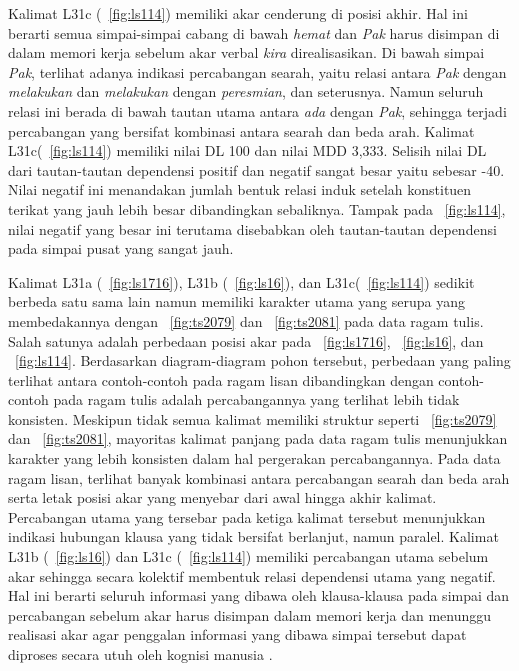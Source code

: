 Kalimat L31c (\pic~\ref{fig:ls114}) memiliki akar cenderung di posisi akhir. Hal ini berarti semua simpai-simpai cabang di bawah \textit{hemat} dan \textit{Pak} harus disimpan di dalam memori kerja sebelum akar verbal \textit{kira} direalisasikan. Di bawah simpai \textit{Pak}, terlihat adanya indikasi percabangan searah, yaitu relasi antara \textit{Pak} dengan \textit{melakukan} dan \textit{melakukan} dengan \textit{peresmian}, dan seterusnya. Namun seluruh relasi ini berada di bawah tautan utama antara \textit{ada} dengan \textit{Pak}, sehingga terjadi percabangan yang bersifat kombinasi antara searah dan beda arah. Kalimat L31c(\pic~\ref{fig:ls114}) memiliki nilai DL 100 dan nilai MDD 3,333. Selisih nilai DL dari tautan-tautan dependensi positif dan negatif sangat besar yaitu sebesar -40. Nilai negatif ini menandakan jumlah bentuk relasi induk setelah konstituen terikat yang jauh lebih besar dibandingkan sebaliknya. Tampak pada \pic~\ref{fig:ls114}, nilai negatif yang besar ini terutama disebabkan oleh tautan-tautan dependensi pada simpai pusat yang sangat jauh.

Kalimat L31a (\pic~\ref{fig:ls1716}), L31b (\pic~\ref{fig:ls16}), dan L31c(\pic~\ref{fig:ls114}) sedikit berbeda satu sama lain namun memiliki karakter utama yang serupa yang membedakannya dengan \pic~\ref{fig:ts2079} dan \pic~\ref{fig:ts2081} pada data ragam tulis. Salah satunya adalah perbedaan posisi akar pada \pic~\ref{fig:ls1716}, \pic~\ref{fig:ls16}, dan \pic~\ref{fig:ls114}. Berdasarkan diagram-diagram pohon tersebut, perbedaan yang paling terlihat antara contoh-contoh pada ragam lisan dibandingkan dengan contoh-contoh pada ragam tulis adalah percabangannya yang terlihat lebih tidak konsisten. Meskipun tidak semua kalimat memiliki struktur seperti \pic~\ref{fig:ts2079} dan \pic~\ref{fig:ts2081}, mayoritas kalimat panjang pada data ragam tulis menunjukkan karakter yang lebih konsisten dalam hal pergerakan percabangannya. Pada data ragam lisan, terlihat banyak kombinasi antara percabangan searah dan beda arah serta letak posisi akar yang menyebar dari awal hingga akhir kalimat. Percabangan utama yang tersebar pada ketiga kalimat tersebut menunjukkan indikasi hubungan klausa yang tidak bersifat berlanjut, namun paralel. Kalimat L31b (\pic~\ref{fig:ls16}) dan L31c (\pic~\ref{fig:ls114}) memiliki percabangan utama sebelum akar sehingga secara kolektif membentuk relasi dependensi utama yang negatif. Hal ini berarti seluruh informasi yang dibawa oleh klausa-klausa pada simpai dan percabangan sebelum akar harus disimpan dalam memori kerja dan menunggu realisasi akar agar penggalan informasi yang dibawa simpai tersebut dapat diproses secara utuh oleh kognisi manusia \citep{hawkins2014cross}.

